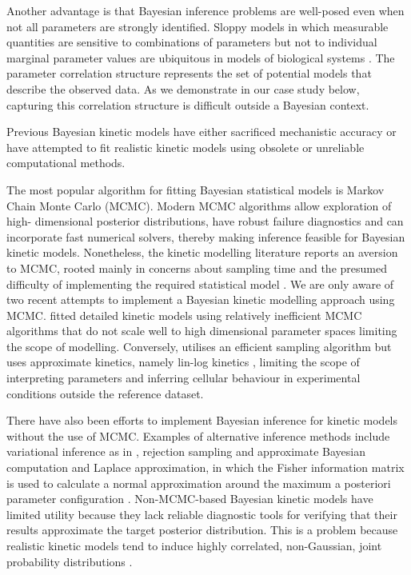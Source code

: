 \documentclass[journal=,manuscript=]{achemso}
\begin{document}
Another advantage is that Bayesian inference problems are well-posed
even when not all parameters are strongly identified. Sloppy models in
which measurable quantities are sensitive to combinations of parameters
but not to individual marginal parameter values are ubiquitous in models
of biological systems \citep{gutenkunst_2007, white_2016}. The parameter
correlation structure represents the set of potential models that
describe the observed data. As we demonstrate in our case study below,
capturing this correlation structure is difficult outside a Bayesian
context.

Previous Bayesian kinetic models have either sacrificed mechanistic
accuracy or have attempted to fit realistic kinetic models using
obsolete or unreliable computational methods.

The most popular algorithm for fitting Bayesian statistical models is
Markov Chain Monte Carlo (MCMC). Modern MCMC algorithms allow
exploration of high- dimensional posterior distributions, have robust
failure diagnostics
\citep{vehtariRankNormalizationFoldingLocalization2021} and can
incorporate fast numerical solvers, thereby making inference feasible
for Bayesian kinetic models. Nonetheless, the kinetic modelling
literature reports an aversion to MCMC, rooted mainly in concerns about
sampling time and the presumed difficulty of implementing the required
statistical model \citep{raue_joining_2013, saa_construction_2016}. We
are only aware of two recent attempts to implement a Bayesian kinetic
modelling approach using MCMC. \citet{stapor_pesto_2018} fitted detailed
kinetic models using relatively inefficient MCMC algorithms that do not
scale well to high dimensional parameter spaces limiting the scope of
modelling. Conversely, \citet{st.johnBayesianInferenceMetabolic2018}
utilises an efficient sampling algorithm but uses approximate kinetics,
namely lin-log kinetics \citet{visser_dynamic_2003}, limiting the scope
of interpreting parameters and inferring cellular behaviour in
experimental conditions outside the reference dataset.

There have also been efforts to implement Bayesian inference for kinetic
models without the use of MCMC. Examples of alternative inference
methods include variational inference as in
\citet{st.johnBayesianInferenceMetabolic2018}, rejection sampling and
approximate Bayesian computation \citet{saa_construction_2016} and
Laplace approximation, in which the Fisher information matrix is used to
calculate a normal approximation around the maximum a posteriori
parameter configuration
\citep{liebermeister_model_2021, gopalakrishnan_k-fit_2020, stapor_pesto_2018, raue_joining_2013}.
Non-MCMC-based Bayesian kinetic models have limited utility because they
lack reliable diagnostic tools for verifying that their results
approximate the target posterior distribution. This is a problem because
realistic kinetic models tend to induce highly correlated, non-Gaussian,
joint probability distributions
\citep{gutenkunst_2007, stapor_pesto_2018}.
\end{document}
